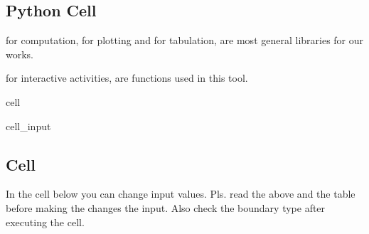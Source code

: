 \documentclass[letterpaper,10pt,english]{jupyterBook}
\begin{document}
\subsection{Python  Cell}
\label{\detokenize{content/tools/1D_advection_dispersion:python-libraries-cell}}
\sphinxAtStartPar
{} for computation,  for plotting and  for tabulation, are most general libraries for our works.

\sphinxAtStartPar
{} \sphinxhyphen{} for interactive activities, are  functions used in this tool.

\sphinxAtStartPar
{}

\begin{sphinxuseclass}{cell}\begin{sphinxVerbatimInput}

\begin{sphinxuseclass}{cell_input}
\begin{sphinxVerbatim}[commandchars=\\\{\}]
 
   
   
   
\end{sphinxVerbatim}

\end{sphinxuseclass}\end{sphinxVerbatimInput}

\end{sphinxuseclass}

\subsection{ Cell}
\label{\detokenize{content/tools/1D_advection_dispersion:input-data-cell}}
\sphinxAtStartPar
In the cell below you can change input values. Pls. read the  above and the table before making the changes the input. Also check the boundary type after executing the cell.

\sphinxAtStartPar
{}
\end{document}
